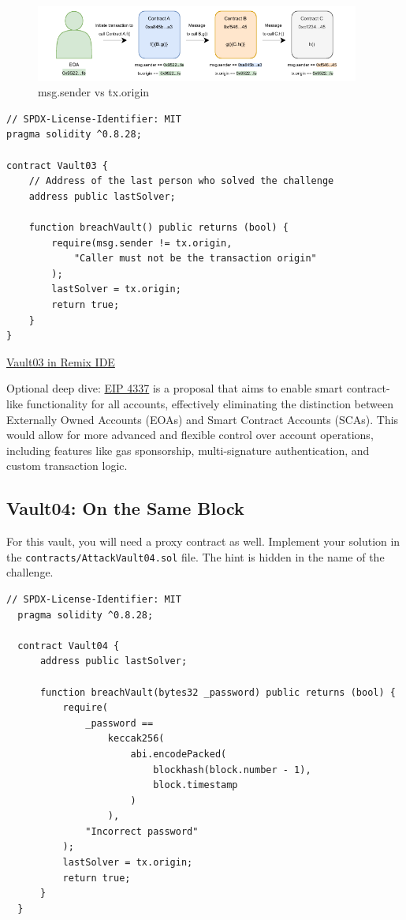 \documentclass[12pt]{article}
\begin{document}
\begin{figure}[h!]
  \centering
  \includegraphics[width=0.95\textwidth]{msg.sender.pdf}
  \caption{msg.sender vs tx.origin}
  \label{fig:msg.sender}
\end{figure}

\begin{lstlisting}[language=Solidity]
// SPDX-License-Identifier: MIT
pragma solidity ^0.8.28;

contract Vault03 {
    // Address of the last person who solved the challenge
    address public lastSolver;

    function breachVault() public returns (bool) {
        require(msg.sender != tx.origin,
            "Caller must not be the transaction origin"
        );
        lastSolver = tx.origin;
        return true;
    }
}
\end{lstlisting}

\medskip
\noindent
\href{https://remix.ethereum.org/?#activate=solidity&url=https://github.com/radovluk/unbreakable-vault/contracts/Vault03.sol&lang=en&optimize=false&runs=200&evmVersion=null&version=soljson-v0.8.28+commit.7893614a.js}{Vault03 in Remix IDE}

\medskip
\noindent
Optional deep dive:
\href{https://eips.ethereum.org/EIPS/eip-4337}{EIP 4337} is a proposal that aims to enable smart contract-like functionality for all accounts, effectively eliminating the distinction between Externally Owned Accounts (EOAs) and Smart Contract Accounts (SCAs). This would allow for more advanced and flexible control over account operations, including features like gas sponsorship, multi-signature authentication, and custom transaction logic.

\subsection*{Vault04: On the Same Block}

For this vault, you will need a proxy contract as well. Implement your solution in the \texttt{contracts/AttackVault04.sol} file. The hint is hidden in the name of the challenge.

\begin{lstlisting}[language=Solidity]
  // SPDX-License-Identifier: MIT
  pragma solidity ^0.8.28;
  
  contract Vault04 {
      address public lastSolver;
  
      function breachVault(bytes32 _password) public returns (bool) {
          require(
              _password ==
                  keccak256(
                      abi.encodePacked(
                          blockhash(block.number - 1),
                          block.timestamp
                      )
                  ),
              "Incorrect password"
          );
          lastSolver = tx.origin;
          return true;
      }
  }
\end{lstlisting}
\end{document}
